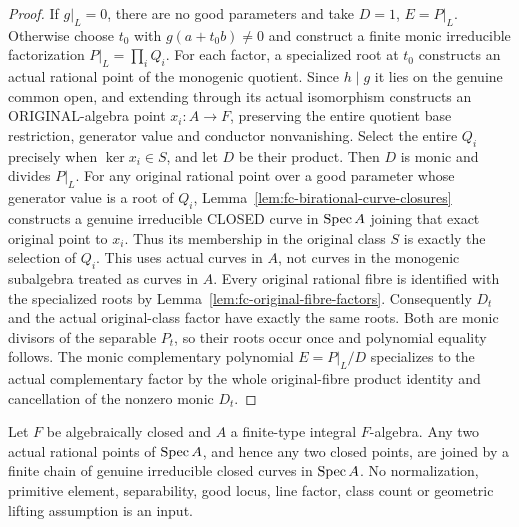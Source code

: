 \begin{proof}
If $g|_L=0$, there are no good parameters and take $D=1$, $E=P|_L$.
Otherwise choose $t_0$ with $g(a+t_0b)\ne0$ and construct a finite monic irreducible factorization
$P|_L=\prod_iQ_i$. For each factor, a specialized root at $t_0$ constructs an actual rational point of the
monogenic quotient. Since $h\mid g$ it lies on the genuine common open, and extending through its actual
isomorphism constructs an ORIGINAL-algebra point $x_i\colon A\to F$, preserving the entire quotient base
restriction, generator value and conductor nonvanishing. Select the entire $Q_i$ precisely when $\ker x_i\in S$,
and let $D$ be their product. Then $D$ is monic and divides $P|_L$.
For any original rational point over a good parameter whose generator value is a root of $Q_i$,
Lemma~\ref{lem:fc-birational-curve-closures} constructs a genuine irreducible CLOSED curve in $\operatorname{Spec} A$
joining that exact original point to $x_i$. Thus its membership in the original class $S$ is exactly the
selection of $Q_i$. This uses actual curves in $A$, not curves in the monogenic subalgebra treated as curves in $A$.
Every original rational fibre is identified with the specialized roots by
Lemma~\ref{lem:fc-original-fibre-factors}. Consequently $D_t$ and the actual original-class factor have exactly
the same roots. Both are monic divisors of the separable $P_t$, so their roots occur once and polynomial
equality follows. The monic complementary polynomial $E=P|_L/D$ specializes to the actual complementary
factor by the whole original-fibre product identity and cancellation of the nonzero monic $D_t$.
\end{proof}

\begin{lemma}\label{lem:fc-affine-integral-curve-chains}
\leanok
{}
Let $F$ be algebraically closed and $A$ a finite-type integral $F$-algebra. Any two actual rational
points of $\operatorname{Spec} A$, and hence any two closed points, are joined by a finite chain of genuine
irreducible closed curves in $\operatorname{Spec} A$. No normalization, primitive element, separability,
good locus, line factor, class count or geometric lifting assumption is an input.
\end{lemma}

